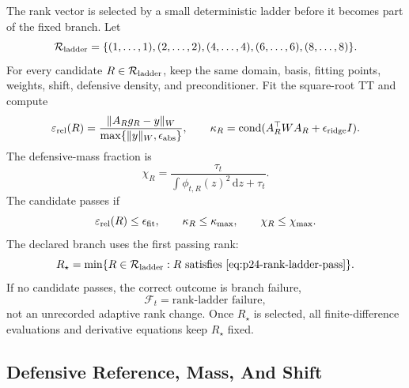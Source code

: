 \documentclass[11pt]{article}
\numberwithin{equation}{section}
\newcommand{\dd}{\,\mathrm d}
\begin{document}
The rank vector is selected by a small deterministic ladder before it becomes
part of the fixed branch.  Let
\begin{equation}
    \mathcal R_{\rm ladder}
    =
    \{(1,\ldots,1),(2,\ldots,2),(4,\ldots,4),(6,\ldots,6),(8,\ldots,8)\}.
    \label{eq:p24-rank-ladder}
\end{equation}
For every candidate \(R\in\mathcal R_{\rm ladder}\), keep the same domain,
basis, fitting points, weights, shift, defensive density, and preconditioner.
Fit the square-root TT and compute
\begin{equation}
    \varepsilon_{\rm rel}(R)
    =
    \frac{\|A_R g_R-y\|_W}{\max\{\|y\|_W,\epsilon_{\rm abs}\}},
    \qquad
    \kappa_R
    =
    \operatorname{cond}(A_R^\top W A_R+\epsilon_{\rm ridge}I).
    \label{eq:p24-rank-ladder-residual}
\end{equation}
The defensive-mass fraction is
\begin{equation}
    \chi_R
    =
    \frac{\tau_t}
         {\int \phi_{t,R}(z)^2\dd z+\tau_t}.
    \label{eq:p24-rank-ladder-defense}
\end{equation}
The candidate passes if
\begin{equation}
    \varepsilon_{\rm rel}(R)\le \epsilon_{\rm fit},
    \qquad
    \kappa_R\le \kappa_{\max},
    \qquad
    \chi_R\le \chi_{\max}.
    \label{eq:p24-rank-ladder-pass}
\end{equation}
The declared branch uses the first passing rank:
\begin{equation}
    R_\star=\min\{R\in\mathcal R_{\rm ladder}:R\text{ satisfies }
    \eqref{eq:p24-rank-ladder-pass}\}.
    \label{eq:p24-rank-ladder-choice}
\end{equation}
If no candidate passes, the correct outcome is branch failure,
\begin{equation}
    \mathcal F_t=\text{rank-ladder failure},
    \label{eq:p24-rank-ladder-failure}
\end{equation}
not an unrecorded adaptive rank change.  Once \(R_\star\) is selected, all
finite-difference evaluations and derivative equations keep \(R_\star\) fixed.

\subsection{Defensive Reference, Mass, And Shift}
\end{document}
